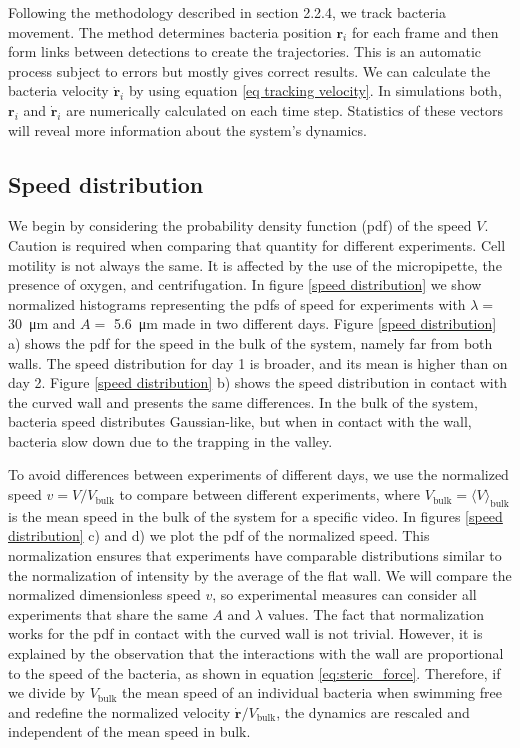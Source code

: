 Following the methodology described in section 2.2.4, we track bacteria movement. The method determines bacteria position $\textbf{r}_i$ for each frame and then form links between detections to create the trajectories. This is an automatic process subject to errors but mostly gives correct results. We can calculate the bacteria velocity $\dot{\textbf{r}}_i$ by using equation \eqref{eq tracking velocity}. In simulations both, $\textbf{r}_i$ and $\dot{\textbf{r}}_i$ are numerically calculated on each time step. Statistics of these vectors will reveal more information about the system's dynamics.

\afterpage{%
\begin{figure}[H]
	\centering
	
	\label{speed distribution}
\end{figure}
}

\subsection{Speed distribution}

We begin by considering the probability density function (pdf) of the speed $V$. Caution is required when comparing that quantity for different experiments. Cell motility is not always the same. It is affected by the use of the micropipette, the presence of oxygen, and centrifugation. In figure \ref{speed distribution} we show normalized histograms representing the pdfs of speed for experiments with $\lambda=$ \SI{30}{\micro\meter} and $A=$ \SI{5.6}{\micro\meter} made in two different days. Figure \ref{speed distribution} a) shows the pdf for the speed in the bulk of the system, namely far from both walls. The speed distribution for day 1 is broader, and its mean is higher than on day 2. Figure \ref{speed distribution} b) shows the speed distribution in contact with the curved wall and presents the same differences. In the bulk of the system, bacteria speed distributes Gaussian-like, but when in contact with the wall, bacteria slow down due to the trapping in the valley.

To avoid differences between experiments of different days, we use the normalized speed $v=V/V_{\text{bulk}}$ to compare between different experiments, where $V_{\text{bulk}} = \langle V \rangle_{\text{bulk}}$ is the mean speed in the bulk of the system for a specific video. In figures \ref{speed distribution} c) and d) we plot the pdf of the normalized speed. This normalization ensures that experiments have comparable distributions similar to the normalization of intensity by the average of the flat wall. We will compare the normalized dimensionless speed $v$, so experimental measures can consider all experiments that share the same $A$ and $\lambda$ values. The fact that normalization works for the pdf in contact with the curved wall is not trivial. However, it is explained by the observation that the interactions with the wall are proportional to the speed of the bacteria, as shown in equation \eqref{eq:steric_force}. Therefore, if we divide by $V_{\text{bulk}}$ the mean speed of an individual bacteria when swimming free and redefine the normalized velocity $\dot{\textbf{r}}/V_{\text{bulk}}$, the dynamics are rescaled and independent of the mean speed in bulk.

